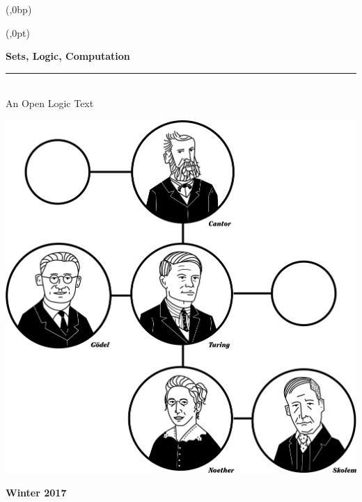 \documentclass{memoir}
\newlength{\coverheight}
\newlength{\spinewidth}
\newlength{\spinepos} %
\newlength{\coverpos} %
\begin{document}
\pagestyle{empty}


\pagecolor{leadbeater}

\begin{textblock*}{\spinewidth}(\spinepos,0bp)%
\noindent\hfil{}\hfil
\end{textblock*}
\newbox\adjust
\begin{textblock*}{\spinepos}(\coverpos,0pt)
  \noindent\hfil
  \begin{minipage}[b][\coverheight][s]{.8\spinepos}
    \vspace{2cm}
    \begin{raggedright}
      \fontsize{32pt}{34pt}\selectfont\bfseries\sffamily%
      Sets, Logic, Computation\\
      \normalfont\fontsize{18pt}{0pt}\selectfont\bfseries\itshape%
      \rule{.8\spinepos}{5pt}\\[5pt]
      An Open Logic Text
    \end{raggedright}
    \noindent\vskip2cm\includegraphics[width=.8\spinepos]{illustrations/Cover}
    \par\noindent
    \vskip 2cm
    \normalfont\fontsize{18pt}{0pt}\selectfont\bfseries\sffamily%
    \hfill Winter 2017 
  \end{minipage}
  \hfil
  \end{textblock*}
\end{document}
